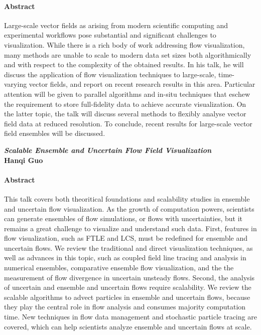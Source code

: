 \documentclass[preprint,journal]{vgtc}       %
\newcommand{\addverticalspace}{\vspace{3mm}}
\begin{document}
\paragraph{Abstract}
Large-scale vector fields as arising from modern scientific computing and experimental workflows pose substantial and significant challenges to visualization. While there is a rich body of work addressing flow visualization, many methods are unable to scale to modern data set sizes both algorithmically and with respect to the complexity of the obtained results. In his talk, he will discuss the application of flow visualization techniques to large-scale, time-varying vector fields, and report on recent research results in this area. Particular attention will be given to parallel algorithms and in-situ techniques that eschew the requirement to store full-fidelity data to achieve accurate visualization. On the latter topic, the talk will discuss several methods to flexibly analyse vector field data at reduced resolution. To conclude, recent results for large-scale vector field ensembles will be discussed.

\addverticalspace

\noindent\textbf{\textit{Scalable Ensemble and Uncertain Flow Field Visualization}}\\
\textbf{Hanqi Guo}
\paragraph{Abstract}
This talk covers both theoritical foundations and scalability studies in ensemble and uncertain flow visualization. As the growth of computation powers, scientists can generate ensembles of flow simulations, or flows with uncertainties, but it remains a great challenge to visualize and understand such data. First, features in flow visualization, such as FTLE and LCS, must be redefined for ensemble and uncertain flows. We review the traditional and direct visualization techniques, as well as advances in this topic, such as coupled field line tracing and analysis in numerical ensembles, comparative ensemble flow visualization, and the the measurement of flow divergence in uncertain unsteady flows. Second, the analysis of uncertain and ensemble and uncertain flows require scalability. We review the scalable algorithms to advect particles in ensemble and uncertain flows, because they play the central role in flow analysis and consumes majority computation time. New techniques in flow data management and stochastic particle tracing are covered, which can help scientists analyze ensemble and uncertain flows at scale. 
\end{document}
